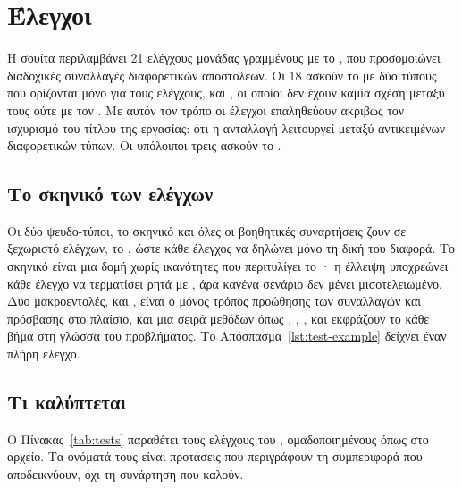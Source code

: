 \section{Έλεγχοι}
\label{sec:tests}

Η σουίτα περιλαμβάνει 21 ελέγχους μονάδας γραμμένους με το , που
προσομοιώνει διαδοχικές συναλλαγές διαφορετικών αποστολέων. Οι 18 ασκούν το 
με δύο τύπους που ορίζονται μόνο για τους ελέγχους,  και , οι
οποίοι δεν έχουν καμία σχέση μεταξύ τους ούτε με τον . Με αυτόν τον
τρόπο οι έλεγχοι επαληθεύουν ακριβώς τον ισχυρισμό του τίτλου της εργασίας: ότι η
ανταλλαγή λειτουργεί μεταξύ αντικειμένων διαφορετικών τύπων. Οι υπόλοιποι τρεις ασκούν το
.

\subsection{Το σκηνικό των ελέγχων}

Οι δύο ψευδο-τύποι, το σκηνικό και όλες οι βοηθητικές συναρτήσεις ζουν σε ξεχωριστό
 ελέγχων, το , ώστε κάθε έλεγχος να δηλώνει μόνο τη δική
του διαφορά. Το σκηνικό είναι μια δομή χωρίς ικανότητες που περιτυλίγει το
· η έλλειψη  υποχρεώνει κάθε έλεγχο να τερματίσει ρητά με
, άρα κανένα σενάριο δεν μένει μισοτελειωμένο. Δύο μακροεντολές,
 και , είναι ο μόνος τρόπος προώθησης των συναλλαγών και
πρόσβασης στο πλαίσιο, και μια σειρά μεθόδων όπως , ,
,  και  εκφράζουν το κάθε
βήμα στη γλώσσα του προβλήματος. Το Απόσπασμα~\ref{lst:test-example} δείχνει έναν πλήρη
έλεγχο.



\subsection{Τι καλύπτεται}

Ο Πίνακας~\ref{tab:tests} παραθέτει τους ελέγχους του , ομαδοποιημένους όπως
στο αρχείο. Τα ονόματά τους είναι προτάσεις που περιγράφουν τη συμπεριφορά που
αποδεικνύουν, όχι τη συνάρτηση που καλούν.

